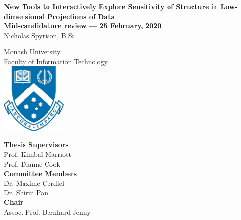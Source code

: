 \documentclass[
  11,
]{article}
\author{}
\date{\vspace{-2.5em}}
\begin{document}

\onehalfspacing
{}

\begin{center}
\huge{\textbf{New Tools to Interactively Explore Sensitivity of Structure in Low-dimensional Projections of Data}}\\
\vspace*{1\baselineskip}
\Large{\textbf{Mid-candidature review --- 25 February, 2020}}\\
\LARGE{Nicholas Spyrison, B.Sc}\\
\vspace*{1\baselineskip}

\LARGE{Monash University}\\
\Large{Faculty of Information Technology}\\
\vspace*{1\baselineskip}
\includegraphics[height = 3.5cm]{./figures/crest.jpg}\\
\vspace*{1\baselineskip}

\Large{\textbf{Thesis Supervisors}}\\
Prof. Kimbal Marriott\\
Prof. Dianne Cook\\
\vspace*{1\baselineskip}
\Large{\textbf{Committee Members}}\\
Dr. Maxime Cordiel\\
Dr. Shirui Pan\\
\vspace*{1\baselineskip}
\Large{\textbf{Chair}}\\
Assoc. Prof. Bernhard Jenny\\
\end{center}

\doublespacing

\newpage
{}
\end{document}
